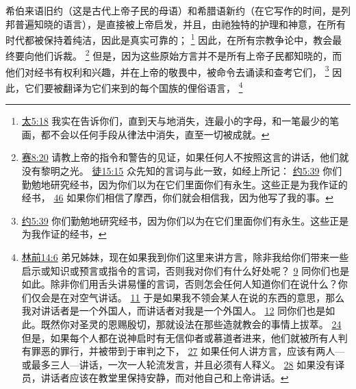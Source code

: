 \documentclass[12pt, a4paper, oneside]{ctexart}
\newcounter{parnum}[section]
\newcommand{\N}{%
   \noindent\refstepcounter{parnum}%
    \makebox[\parindent][l]{\textbf{\arabic{parnum}.}}}
\begin{document}
\N 希伯来语旧约（这是古代上帝子民的母语）和希腊语新约（在它写作的时间，是列邦普遍知晓的语言），是直接被上帝启发，并且，由祂独特的护理和神意，在所有时代都被保持着纯洁，因此是真实可靠的；
	\footnote {
		\href{https://biblehub.com/matthew/5-18.htm}{太5:18} 我实在告诉你们，直到天与地消失，连最小的字母，和一笔最少的笔画，都不会以任何手段从律法中消失，直至一切被成就。
	}
	因此，在所有宗教争论中，教会最终要向他们诉裁。
	\footnote {
		\href{https://biblehub.com/isaiah/8-20.htm}{赛8:20} 请教上帝的指令和警告的见证，如果任何人不按照这言的讲话，他们就没有黎明之光。
		\href{https://biblehub.com/acts/15-15.htm}{徒15:15} 众先知的言词与此一致，如经上所记：
		\href{https://biblehub.com/john/5-39.htm}{约5:39} 你们勤勉地研究经书，因为你们以为在它们里面你们有永生。这些正是为我作证的经书，
		\href{https://biblehub.com/john/5-46.htm}{46} 如果你们相信了摩西，你们就会相信我，因为他写了我的事。
	}
	但是，因为这些原始方言并不是所有上帝子民都知晓的，而他们对经书有权利和兴趣，并在上帝的敬畏中，被命令去诵读和查考它们，
	\footnote {
		\href{https://biblehub.com/john/5-39.htm}{约5:39} 你们勤勉地研究经书，因为你们以为在它们里面你们有永生。这些正是为我作证的经书，
	}
	因此，它们要被翻译为它们来到的每个国族的俚俗语言，
	\footnote {
		\href{https://biblehub.com/1_corinthians/14-6.htm}{林前14:6} 弟兄姊妹，现在如果我到你们这里来讲方言，除非我给你们带来一些启示或知识或预言或指令的言词，否则我对你们有什么好处呢？
		\href{https://biblehub.com/1_corinthians/14-9.htm}{9} 同你们也是如此。除非你们用舌头讲易懂的言词，否则怎会任何人知道你们在说什么？你们仅会是在对空气讲话。
		\href{https://biblehub.com/1_corinthians/14-11.htm}{11} 于是如果我不领会某人在说的东西的意思，那么我对讲话者是一个外国人，而讲话者对我是一个外国人。
		\href{https://biblehub.com/1_corinthians/14-12.htm}{12} 同你们也是如此。既然你对圣灵的恩赐殷切，那就设法在那些造就教会的事情上拔萃。
		\href{https://biblehub.com/1_corinthians/14-24.htm}{24} 但是，如果每个人都在说神启时有无信仰者或慕道者进来，他们就被所有人判有罪恶的罪行，并被带到于审判之下，
		\href{https://biblehub.com/1_corinthians/14-27.htm}{27} 如果任何人讲方言，应该有两人---或最多三人---讲话，一次一人轮流发言，并且必须有人释义。
		\href{https://biblehub.com/1_corinthians/14-28.htm}{28} 如果没有译员，讲话者应该在教堂里保持安静，而对他自己和上帝讲话。
	}
\end{document}
